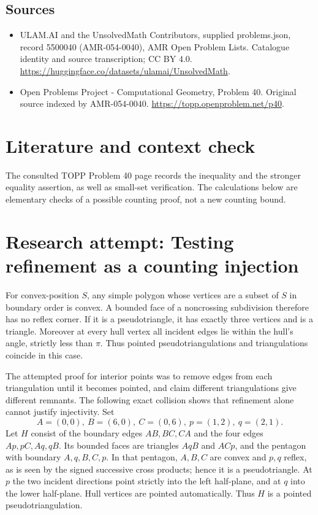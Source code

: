 \documentclass[11pt,a4paper]{article}
\begin{document}
\subsection{Sources}
\begin{itemize}
\item[S1] ULAM.AI and the UnsolvedMath Contributors, supplied problems.json, record 5500040 (AMR-054-0040), AMR Open Problem Lists. Catalogue identity and source transcription; CC BY 4.0.
\url{https://huggingface.co/datasets/ulamai/UnsolvedMath}.
\item[S2] Open Problems Project - Computational Geometry, Problem 40. Original source indexed by AMR-054-0040.
\url{https://topp.openproblem.net/p40}.
\end{itemize}

\section{Literature and context check}
The consulted TOPP Problem 40 page records the inequality and the stronger
equality assertion, as well as small-set verification. The calculations below
are elementary checks of a possible counting proof, not a new counting bound.
\section{Research attempt: Testing refinement as a counting injection}
For convex-position $S$, any simple polygon whose vertices are a subset of
$S$ in boundary order is convex. A bounded face of a noncrossing subdivision
therefore has no reflex corner. If it is a pseudotriangle, it has exactly three
vertices and is a triangle. Moreover at every hull vertex all incident edges lie
within the hull's angle, strictly less than $\pi$. Thus pointed
pseudotriangulations and triangulations coincide in this case.

The attempted proof for interior points was to remove edges from each
triangulation until it becomes pointed, and claim different triangulations give
different remnants. The following exact collision shows that refinement alone
cannot justify injectivity. Set
\[
 A=(0,0),\ B=(6,0),\ C=(0,6),\ p=(1,2),\ q=(2,1).
\]
Let $H$ consist of the boundary edges $AB,BC,CA$ and the four edges
$Ap,pC,Aq,qB$. Its bounded faces are triangles $AqB$ and $ACp$, and the
pentagon with boundary $A,q,B,C,p$. In that pentagon, $A,B,C$ are convex
and $p,q$ reflex, as is seen by the signed successive cross products; hence
it is a pseudotriangle. At $p$ the two incident directions point strictly into
the left half-plane, and at $q$ into the lower half-plane. Hull vertices are
pointed automatically. Thus $H$ is a pointed pseudotriangulation.
\end{document}
